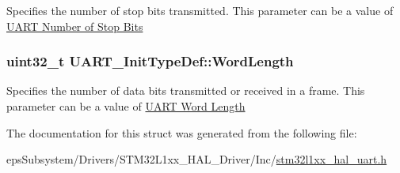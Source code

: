 Specifies the number of stop bits transmitted. This parameter can be a value of \hyperlink{group___u_a_r_t___stop___bits}{U\-A\-R\-T Number of Stop Bits} \hypertarget{struct_u_a_r_t___init_type_def_a0f1cd85e62aa4fd4b36ee9e610e7789f}{
\subsubsection[{Word\-Length}]{\setlength{\rightskip}{0pt plus 5cm}uint32\-\_\-t U\-A\-R\-T\-\_\-\-Init\-Type\-Def\-::\-Word\-Length}}\label{struct_u_a_r_t___init_type_def_a0f1cd85e62aa4fd4b36ee9e610e7789f}
Specifies the number of data bits transmitted or received in a frame. This parameter can be a value of \hyperlink{group___u_a_r_t___word___length}{U\-A\-R\-T Word Length} 

The documentation for this struct was generated from the following file\-:\begin{DoxyCompactItemize}
\item 
eps\-Subsystem/\-Drivers/\-S\-T\-M32\-L1xx\-\_\-\-H\-A\-L\-\_\-\-Driver/\-Inc/\hyperlink{stm32l1xx__hal__uart_8h}{stm32l1xx\-\_\-hal\-\_\-uart.\-h}\end{DoxyCompactItemize}
